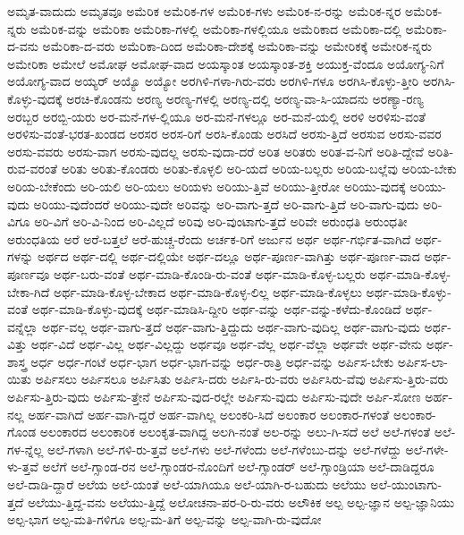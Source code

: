 {ಅಮೃತ-ವಾದುದು
ಅಮೃತವೂ
ಅಮೆರಿಕ
ಅಮೆರಿಕ-ಗಳ
ಅಮೆರಿಕ-ಗಳು
ಅಮೆರಿಕ-ನ-ರನ್ನು
ಅಮೆರಿಕ-ನ್ನರ
ಅಮೆರಿಕ-ನ್ನರು
ಅಮೆರಿಕ-ವನ್ನು
ಅಮೆರಿಕಾ
ಅಮೆರಿಕಾ-ಗಳಲ್ಲಿ
ಅಮೆರಿಕಾ-ಗಳಲ್ಲಿಯೂ
ಅಮೆರಿಕಾದ
ಅಮೆರಿಕಾ-ದಲ್ಲಿ
ಅಮೆರಿಕಾ-ದ-ವನು
ಅಮೆರಿಕಾ-ದ-ವರು
ಅಮೆರಿಕಾ-ದಿಂದ
ಅಮೆರಿಕಾ-ದೇಶಕ್ಕೆ
ಅಮೆರಿಕಾ-ವನ್ನು
ಅಮೇರಿಕಕ್ಕೆ
ಅಮೇರಿಕ-ನ್ನರು
ಅಮೇರಿಕಾ
ಅಮೇಲೆ
ಅಮೋಘ
ಅಮೋಘ-ವಾದ
ಅಯಸ್ಕಾಂತ
ಅಯಸ್ಕಾಂತ-ಶಕ್ತಿ
ಅಯುಕ್ತ-ವೆಂದೂ
ಅಯೋಗ್ಯ-ನಿಗೆ
ಅಯೋಗ್ಯ-ವಾದ
ಅಯ್ಯರ್
ಅಯ್ಯೊ
ಅಯ್ಯೋ
ಅರಗಿಳಿ-ಗಳಾ-ಗಿರು-ವರು
ಅರಗಿಳಿ-ಗಳೂ
ಅರಗಿಸಿ-ಕೊಳ್ಳು-ತ್ತೀರಿ
ಅರಗಿಸಿ-ಕೊಳ್ಳು-ವುದಕ್ಕೆ
ಅರಚಿ-ಕೊಂಡನು
ಅರಣ್ಯ
ಅರಣ್ಯ-ಗಳಲ್ಲಿ
ಅರಣ್ಯ-ದಲ್ಲಿ
ಅರಣ್ಯ-ವಾ-ಸಿ-ಯಾದನು
ಅರಣ್ಯಾ-ರಣ್ಯ
ಅರಬ್ಬರ
ಅರಬ್ಬಿ-ಯರು
ಅರ-ಮನೆ-ಗಳ-ಲ್ಲಿಯೂ
ಅರ-ಮನೆ-ಗಳಲ್ಲೂ
ಅರ-ಮನೆ-ಯಲ್ಲಿ
ಅರಳಿ
ಅರಳಿಸು-ವಂತೆ
ಅರಳಿಸು-ವಂತೆ-ಭರತ-ಖಂಡದ
ಅರಸರ
ಅರಸ-ರಿಗೆ
ಅರಸಿ-ಕೊಂಡು
ಅರಸಿದೆ
ಅರಸು-ತ್ತಿದೆ
ಅರಸುವ
ಅರಸು-ವವರ
ಅರಸು-ವವರು
ಅರಸು-ವಾಗ
ಅರಸು-ವುದಲ್ಲ
ಅರಸು-ವುದಾ-ದರೆ
ಅರಿತ
ಅರಿತರು
ಅರಿತ-ವ-ನಿಗೆ
ಅರಿತಿ-ದ್ದೇವೆ
ಅರಿತಿ-ರುವ-ವರಂತೆ
ಅರಿತು
ಅರಿತು-ಕೊಂಡರು
ಅರಿತು-ಕೊಳ್ಳಲಿ
ಅರಿ-ಯದೆ
ಅರಿಯ-ಬಲ್ಲರು
ಅರಿಯ-ಬಲ್ಲೆವು
ಅರಿಯ-ಬೇಕು
ಅರಿಯ-ಬೇಕೆಂದು
ಅರಿ-ಯಲಿ
ಅರಿ-ಯಲು
ಅರಿಯಳು
ಅರಿಯು-ತ್ತಿವೆ
ಅರಿಯು-ತ್ತೀರೋ
ಅರಿಯು-ವುದಕ್ಕೆ
ಅರಿಯು-ವುದು
ಅರಿಯು-ವುದೆಂದರೆ
ಅರಿಯು-ವುದೇ
ಅರಿವನ್ನು
ಅರಿ-ವಾಗು-ತ್ತದೆ
ಅರಿ-ವಾಗು-ತ್ತಿದೆ
ಅರಿ-ವಾಗು-ವುದು
ಅರಿ-ವಿಗೂ
ಅರಿ-ವಿಗೆ
ಅರಿ-ವಿ-ನಿಂದ
ಅರಿ-ವಿಲ್ಲದೆ
ಅರಿವು
ಅರಿ-ವುಂಟಾಗು-ತ್ತದೆ
ಅರಿವೇ
ಅರುಂಧತಿ
ಅರುಂಧತೀ
ಅರುಂಧತಿಯ
ಅರೆ
ಅರೆ-ಬತ್ತಲೆ
ಅರೆ-ಹುಚ್ಚ-ರೆಂದು
ಅರ್ಚಕ-ರಿಗೆ
ಅರ್ಜುನ
ಅರ್ಥ
ಅರ್ಥ-ಗರ್ಭಿತ-ವಾಗಿದೆ
ಅರ್ಥ-ಗಳನ್ನು
ಅರ್ಥದ
ಅರ್ಥ-ದಲ್ಲಿ
ಅರ್ಥ-ದಲ್ಲಿಯೇ
ಅರ್ಥ-ದಲ್ಲೂ
ಅರ್ಥ-ಪೂರ್ಣ-ವಾಗಿತ್ತು
ಅರ್ಥ-ಪೂರ್ಣ-ವಾದ
ಅರ್ಥ-ಪೂರ್ಣವೂ
ಅರ್ಥ-ಬರು-ವಂತೆ
ಅರ್ಥ-ಮಾಡಿ-ಕೊಂಡಿ-ರು-ವಂತೆ
ಅರ್ಥ-ಮಾಡಿ-ಕೊಳ್ಳ-ಬಲ್ಲರು
ಅರ್ಥ-ಮಾಡಿ-ಕೊಳ್ಳ-ಬೇಕಾ-ಗಿದೆ
ಅರ್ಥ-ಮಾಡಿ-ಕೊಳ್ಳ-ಬೇಕಾದ
ಅರ್ಥ-ಮಾಡಿ-ಕೊಳ್ಳ-ಲಿಲ್ಲ
ಅರ್ಥ-ಮಾಡಿ-ಕೊಳ್ಳಲು
ಅರ್ಥ-ಮಾಡಿ-ಕೊಳ್ಳು-ವಂತೆ
ಅರ್ಥ-ಮಾಡಿ-ಕೊಳ್ಳು-ವುದಕ್ಕೆ
ಅರ್ಥ-ಮಾಡಿಸಿ-ದ್ದೀರಿ
ಅರ್ಥ-ವನ್ನು
ಅರ್ಥ-ವನ್ನು-ಕಳೆದು-ಕೊಂಡಿದೆ
ಅರ್ಥ-ವನ್ನೆಲ್ಲಾ
ಅರ್ಥ-ವಲ್ಲ
ಅರ್ಥ-ವಾಗು-ತ್ತದೆ
ಅರ್ಥ-ವಾಗು-ತ್ತಿದ್ದುದು
ಅರ್ಥ-ವಾಗು-ವುದಿಲ್ಲ
ಅರ್ಥ-ವಾಗು-ವುದು
ಅರ್ಥ-ವಿತ್ತು
ಅರ್ಥ-ವಿದೆ
ಅರ್ಥ-ವಿಲ್ಲ
ಅರ್ಥ-ವಿಲ್ಲದ್ದು
ಅರ್ಥವೂ
ಅರ್ಥ-ವೆಲ್ಲ
ಅರ್ಥ-ವೆಲ್ಲಾ
ಅರ್ಥವೇ
ಅರ್ಥ-ವೇನು
ಅರ್ಥ-ಶಾಸ್ತ್ರ
ಅರ್ಧ
ಅರ್ಧ-ಗಂಟೆ
ಅರ್ಧ-ಭಾಗ
ಅರ್ಧ-ಭಾಗ-ವನ್ನು
ಅರ್ಧ-ರಾತ್ರಿ
ಅರ್ಧ-ವನ್ನು
ಅರ್ಪಿಸ-ಬೇಕು
ಅರ್ಪಿಸ-ಲಾ-ಯಿತು
ಅರ್ಪಿಸಲು
ಅರ್ಪಿಸಲೂ
ಅರ್ಪಿಸಿತು
ಅರ್ಪಿಸಿ-ದರು
ಅರ್ಪಿಸಿ-ರು-ವರು
ಅರ್ಪಿಸಿರು-ವೆವು
ಅರ್ಪಿಸು-ತ್ತಿರು-ವರು
ಅರ್ಪಿಸು-ತ್ತಿರು-ವುದು
ಅರ್ಪಿಸು-ತ್ತೇನೆ
ಅರ್ಪಿಸು-ವುದ-ರಲ್ಲೇ
ಅರ್ಪಿಸು-ವುದು
ಅರ್ಪಿಸು-ವುದೇ
ಅರ್ಪಿ-ಸೋಣ
ಅರ್ಹ-ನಲ್ಲ
ಅರ್ಹ-ವಾಗಿದೆ
ಅರ್ಹ-ವಾಗಿ-ದ್ದರೆ
ಅರ್ಹ-ವಾಗಿಲ್ಲ
ಅಲಂಕರಿ-ಸಿದೆ
ಅಲಂಕಾರ
ಅಲಂಕಾರ-ಗಳಂತೆ
ಅಲಂಕಾರ-ಗೊಂಡ
ಅಲಂಕಾರದ
ಅಲಂಕಾರಿಕ
ಅಲಂಕೃತ-ವಾಗಿದ್ದ
ಅಲಗಿ-ನಂತೆ
ಅಲ-ರನ್ನು
ಅಲು-ಗಿ-ಸದೆ
ಅಲೆ
ಅಲೆ-ಗಳಂತೆ
ಅಲೆ-ಗಳ-ನ್ನೆಲ್ಲ
ಅಲೆ-ಗಳಾಗಿ
ಅಲೆ-ಗಳಿ-ರು-ತ್ತವೆ
ಅಲೆ-ಗಳು
ಅಲೆ-ಗಳೆಂದು
ಅಲೆ-ಗಳೆಂಬು-ದನ್ನು
ಅಲೆ-ಗಳೆದ್ದು
ಅಲೆ-ಗಳೇ-ಳು-ತ್ತವೆ
ಅಲೆಗೆ
ಅಲೆ-ಗ್ಸಾಂಡ-ರನ
ಅಲೆ-ಗ್ಸಾಂಡರ-ನೊಂದಿಗೆ
ಅಲೆ-ಗ್ಸಾಂಡರ್
ಅಲೆ-ಗ್ಸಾಂಡ್ರಿಯಾ
ಅಲೆ-ದಾಡಿದ್ದರೂ
ಅಲೆ-ದಾಡಿ-ದ್ದಾರೆ
ಅಲೆಯ
ಅಲೆ-ಯಂತೆ
ಅಲೆ-ಯಾಗಿಯೂ
ಅಲೆ-ಯಾಗಿ-ರ-ಬಹುದು
ಅಲೆಯು
ಅಲೆ-ಯುಂಟಾಗು-ತ್ತದೆ
ಅಲೆಯು-ತ್ತಿದ್ದ-ವನು
ಅಲೆಯು-ತ್ತಿದ್ದೆ
ಅಲೋಚನಾ-ಪರ-ರಿ-ರು-ವರು
ಅಲೌಕಿಕ
ಅಲ್ಪ
ಅಲ್ಪ-ಜ್ಞಾನ
ಅಲ್ಪ-ಜ್ಞಾನಿಯು
ಅಲ್ಪ-ಭಾಗ
ಅಲ್ಪ-ಮತಿ-ಗಳಿಗೂ
ಅಲ್ಪ-ಮ-ತಿಗೆ
ಅಲ್ಪ-ವನ್ನು
ಅಲ್ಪ-ವಾಗಿ-ರು-ವುದೋ
}
